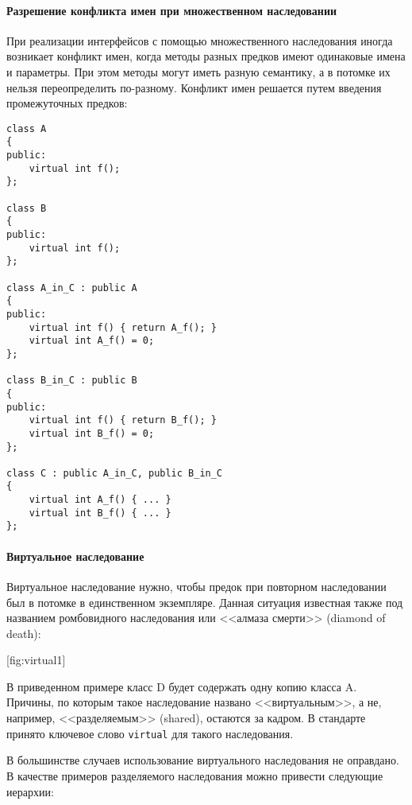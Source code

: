 \newpage
\paragraph{Разрешение конфликта имен при множественном наследовании}

При реализации интерфейсов с помощью множественного наследования иногда возникает конфликт имен, когда методы разных предков имеют одинаковые имена и параметры. При этом методы могут иметь разную семантику, а в потомке их нельзя переопределить по-разному. Конфликт имен решается путем введения промежуточных предков:

\begin{lstlisting}[frame=single]
class A
{
public:
    virtual int f();
};

class B
{
public:
    virtual int f();
};

class A_in_C : public A
{
public:
    virtual int f() { return A_f(); }
    virtual int A_f() = 0;
};

class B_in_C : public B
{
public:
    virtual int f() { return B_f(); }
    virtual int B_f() = 0;
};

class C : public A_in_C, public B_in_C
{
    virtual int A_f() { ... }
    virtual int B_f() { ... }
};
\end{lstlisting} 

\newpage
\paragraph{Виртуальное наследование}

Виртуальное наследование нужно, чтобы предок при повторном наследовании был в потомке в единственном экземпляре. Данная ситуация известная также под названием ромбовидного наследования или <<алмаза смерти>> (diamond of death):

[fig:virtual1]

В приведенном примере класс D будет содержать одну копию класса A. Причины, по которым такое наследование названо <<виртуальным>>, а не, например, <<разделяемым>> (shared), остаются за кадром. В стандарте принято ключевое слово \lstinline|virtual| для такого наследования.

В большинстве случаев использование виртуального наследования не оправдано. В качестве примеров разделяемого наследования можно привести следующие иерархии:

